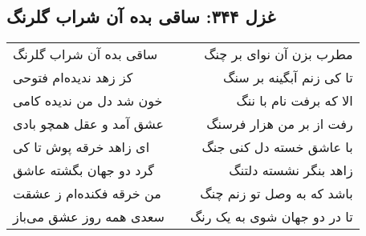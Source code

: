 \begin{center}
\section*{غزل ۳۴۴: ساقی بده آن شراب گلرنگ}
\label{sec:344}
\begin{longtable}{l p{0.5cm} r}
ساقی بده آن شراب گلرنگ
&&
مطرب بزن آن نوای بر چنگ
\\
کز زهد ندیده‌ام فتوحی
&&
تا کی زنم آبگینه بر سنگ
\\
خون شد دل من ندیده کامی
&&
الا که برفت نام با ننگ
\\
عشق آمد و عقل همچو بادی
&&
رفت از بر من هزار فرسنگ
\\
ای زاهد خرقه پوش تا کی
&&
با عاشق خسته دل کنی جنگ
\\
گرد دو جهان بگشته عاشق
&&
زاهد بنگر نشسته دلتنگ
\\
من خرقه فکنده‌ام ز عشقت
&&
باشد که به وصل تو زنم چنگ
\\
سعدی همه روز عشق می‌باز
&&
تا در دو جهان شوی به یک رنگ
\\
\end{longtable}
\end{center}
